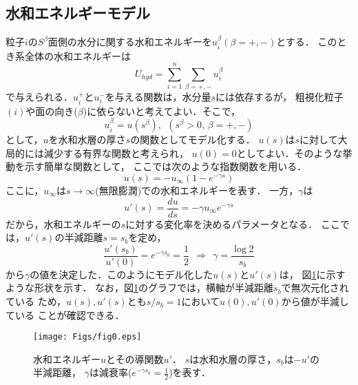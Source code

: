 \subsection{水和エネルギーモデル}
粒子$i$の$S^\beta$面側の水分に関する水和エネルギーを$u^\beta_i(\beta=+,-)$とする．
このとき系全体の水和エネルギーは
\begin{equation}
	U_{hyd}=\sum_{i=1}^n\sum_{\beta=+,-} u_i^{\beta}
	\label{eqn:}
\end{equation}
で与えられる．$u^+_i$と$u^-_i$を与える関数は，水分量$s$には依存するが，
粗視化粒子$(i)$や面の向き($\beta$)に依らないと考えてよい．そこで，
\begin{equation}
	u^\beta_i= u(s^\beta), \ \ (s^\beta>0,\, \beta=+,-)
	\label{eqn:}
\end{equation}
として，$u$を水和水層の厚さ$s$の関数としてモデル化する．
$u(s)$は$s$に対して大局的には減少する有界な関数と考えられ，
$u(0)=0$としてよい．そのような挙動を示す簡単な関数として，
ここでは次のような指数関数を用いる．
\begin{equation}
	u(s)=-u_{\infty} \left(1-e^{-\gamma s} \right)
	\label{eqn:u_s}
\end{equation}
ここに，$u_{\infty}$は$s\rightarrow \infty$(無限膨潤)での水和エネルギーを表す．
一方，$\gamma$は
\begin{equation}
	u'(s)=\frac{du}{ds}=-\gamma u_{\infty} e^{-\gamma s}
	\label{eqn:ud_s}
\end{equation}
だから，水和エネルギーの$s$に対する変化率を決めるパラメータとなる．
ここでは，$u'(s)$の半減距離$s=s_b$を定め，
\begin{equation}
	\frac{u'\left(s_b\right)}{u'(0)}=e^{-\gamma s_b}=\frac{1}{2} 
	\ \ \Rightarrow \ \
	\gamma=\frac{\log 2}{s_b}
	\label{eqn:}
\end{equation}
から$\gamma$の値を決定した．このようにモデル化した$u(s)$と$u'(s)$は，
図\ref{fig:fig0}に示すような形状を示す．
なお，図\ref{fig:fig0}のグラフでは，横軸が半減距離$s_b$で無次元化されている
ため，$u(s),u'(s)$とも$s/s_b=1$において$u(0),u'(0)$から値が半減している
ことが確認できる．
\begin{figure}[h]
	\begin{center}
	\texttt{[image: Figs/fig0.eps]} 
	\end{center}
	\caption{
		水和エネルギー$u$とその導関数$u'$．
		$s$は水和水層の厚さ，$s_b$は$-u'$の半減距離，
		$\gamma$は減衰率($e^{-\gamma s_b}=\frac{1}{2}$)を表す．
	} 
	\label{fig:fig0}
\end{figure}
